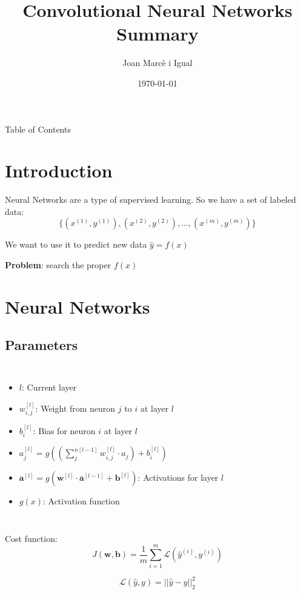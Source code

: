 \documentclass{beamer}
\title{Convolutional Neural Networks Summary}
\date{\today}
\author[Joan]{Joan Marcè i Igual}
\institute[UHN]{University Health Network}
\begin{document}
\begin{frame}
	\titlepage
\end{frame}
\begin{frame}{Table of Contents}
	\tableofcontents
\end{frame}

\section{Introduction}
\begin{frame}{\secname}
	Neural Networks are a type of supervised learning. So we have a set of labeled data:
	$$\{(x^{(1)}, y^{(1)}), (x^{(2)}, y^{(2)}), ..., (x^{(m)}, y^{(m)})\}$$
	
	We want to use it to predict new data $\hat{y} = f(x)$
	
	\textbf{Problem}: search the proper $f(x)$
\end{frame}
\section{Neural Networks}
\begin{frame}{\secname}
	
\end{frame}
\subsection{Parameters}
\begin{frame}{\subsecname}
    \begin{columns}[t]
        \begin{itemize}
            \item $l$: Current layer
            \item $w_{i, j}^{[l]}$: Weight from neuron $j$ to $i$ at layer $l$
            \item $b_{i}^{[l]}$: Bias for neuron $i$ at layer $l$
            \item $a_{j}^{[l]} = g\left( \left( \sum_{j}^{n[l-1]}  w_{i, j}^{[l]} \cdot a_{j} \right) + b_i^{[l]} \right)$
            \item $\bm{a}^{[l]} = g(\bm{w}^{[l]}\cdot \bm{a}^{[l - 1]} + \bm{b}^{[l]})$: Activations for layer $l$
            \item $g(x)$: Activation function
        \end{itemize}
        \centering
        
    \end{columns}
\end{frame}
\begin{frame}
    Cost function:
    $$
    J(\bm{w}, \bm{b}) = \frac{1}{m} \sum_{i=1}^{m} \mathcal{L}(\hat{y}^{(i)}, y^{(i)})
    $$
    
    
    $$
    \mathcal{L}(\hat{y}, y) = ||\hat{y} - y||^2_2
    $$
\end{frame}
\end{document}

